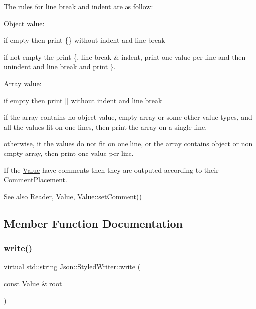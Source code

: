 The rules for line break and indent are as follow\+:
\begin{DoxyItemize}
\item \mbox{\hyperlink{class_object}{Object}} value\+:
\begin{DoxyItemize}
\item if empty then print \{\} without indent and line break
\item if not empty the print \textquotesingle{}\{\textquotesingle{}, line break \& indent, print one value per line and then unindent and line break and print \textquotesingle{}\}\textquotesingle{}.
\end{DoxyItemize}
\item Array value\+:
\begin{DoxyItemize}
\item if empty then print \mbox{[}\mbox{]} without indent and line break
\item if the array contains no object value, empty array or some other value types, and all the values fit on one lines, then print the array on a single line.
\item otherwise, it the values do not fit on one line, or the array contains object or non empty array, then print one value per line.
\end{DoxyItemize}
\end{DoxyItemize}

If the \mbox{\hyperlink{class_json_1_1_value}{Value}} have comments then they are outputed according to their \mbox{\hyperlink{namespace_json_a4fc417c23905b2ae9e2c47d197a45351}{Comment\+Placement}}.

\begin{DoxySeeAlso}{See also}
\mbox{\hyperlink{class_json_1_1_reader}{Reader}}, \mbox{\hyperlink{class_json_1_1_value}{Value}}, \mbox{\hyperlink{class_json_1_1_value_a29f3a30f7e5d3af6f38d57999bf5b480}{Value\+::set\+Comment()}} 
\end{DoxySeeAlso}


\subsection{Member Function Documentation}
\mbox{\label{class_json_1_1_styled_writer_a35036ba0842bc65500274c9ec30708d1}} 
\subsubsection{\texorpdfstring{write()}{write()}}
{\footnotesize\ttfamily virtual std\+::string Json\+::\+Styled\+Writer\+::write (\begin{DoxyParamCaption}\item[{const \mbox{\hyperlink{class_json_1_1_value}{Value}} \&}]{root }\end{DoxyParamCaption})\hspace{0.3cm}{\ttfamily [virtual]}}



